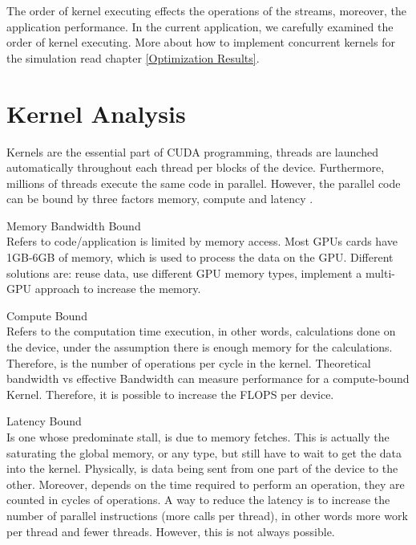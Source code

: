 The order of kernel executing effects the operations of the streams, moreover, the application performance. In the current application, we carefully examined the order of kernel executing. More about how to implement concurrent kernels for the simulation read chapter \ref{Optimization Results}.

\section{Kernel Analysis}

 Kernels are the essential part of CUDA programming, threads are launched automatically throughout each thread per blocks of the device. Furthermore, millions of threads execute the same code in parallel. However, the parallel code can be bound by three factors memory, compute and latency \cite{cook}.

\begin{description}

 \item{Memory Bandwidth Bound} \hfill \\
 
  Refers to code/application is limited by memory access. Most GPUs cards have 1GB-6GB of memory, which is used to process the data on the GPU. Different solutions are: reuse data, use different GPU memory types, implement a multi-GPU approach to increase the memory.

  \item{Compute Bound} \hfill \\
Refers to the computation time execution, in other words, calculations done on the device, under the assumption there is enough memory for the calculations. Therefore, is the number of operations per cycle in the kernel. Theoretical bandwidth vs effective Bandwidth can measure performance for a compute-bound Kernel. Therefore, it is possible to increase the FLOPS per device.

 \item{Latency Bound} \hfill \\
 Is one whose predominate stall, is due to memory fetches. This is actually the saturating the global memory, or any type, but still have to wait to get the data into the kernel. Physically, is data being sent from one part of the device to the other. Moreover, depends on the time required to perform an operation, they are counted in cycles of operations. A way to reduce the latency is to increase the number of parallel instructions (more  calls per thread), in other words more work per thread and fewer threads. However, this is not always possible.
 \end{description}
 

